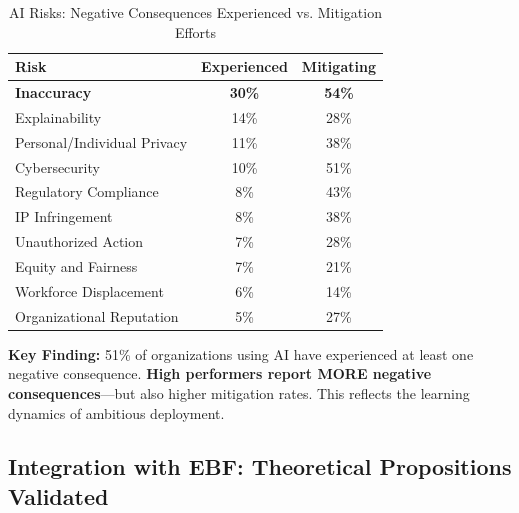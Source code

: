 \begin{table}[htbp]
\centering
\caption{AI Risks: Negative Consequences Experienced vs. Mitigation Efforts}
\label{tab:vvv1-risks}
\renewcommand{\arraystretch}{1.3}
\begin{tabular}{@{}lcc@{}}
\toprule
\textbf{Risk} & \textbf{Experienced} & \textbf{Mitigating} \\
\midrule
\textbf{Inaccuracy} & \textbf{30\%} & \textbf{54\%} \\
Explainability & 14\% & 28\% \\
Personal/Individual Privacy & 11\% & 38\% \\
Cybersecurity & 10\% & 51\% \\
Regulatory Compliance & 8\% & 43\% \\
IP Infringement & 8\% & 38\% \\
Unauthorized Action & 7\% & 28\% \\
Equity and Fairness & 7\% & 21\% \\
Workforce Displacement & 6\% & 14\% \\
Organizational Reputation & 5\% & 27\% \\
\bottomrule
\end{tabular}
\end{table}

\textbf{Key Finding:} 51\% of organizations using AI have experienced at least one negative consequence. \textbf{High performers report MORE negative consequences}---but also higher mitigation rates. This reflects the learning dynamics of ambitious deployment.


\subsection{Integration with EBF: Theoretical Propositions Validated}
\label{sec:vvv1-integration}

